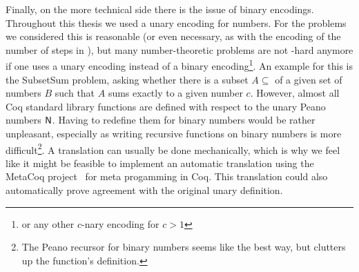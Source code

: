 Finally, on the more technical side there is the issue of binary encodings. Throughout this thesis we used a unary encoding for numbers. For the problems we considered this is reasonable (or even necessary, as with the encoding of the number of steps in \gennp{}), but many number-theoretic problems are not \NP{}-hard anymore if one uses a unary encoding instead of a binary encoding\footnote{or any other $c$-nary encoding for $c> 1$}. An example for this is the \textsf{SubsetSum} problem, asking whether there is a subset $A \subseteq$ of a given set of numbers $B$ such that $A$ sums exactly to a given number $c$. 
However, almost all Coq standard library functions are defined with respect to the unary Peano numbers $\mathsf{N}$. 
Having to redefine them for binary numbers would be rather unpleasant, especially as writing recursive functions on binary numbers is more difficult\footnote{The Peano recursor for binary numbers seems like the best way, but clutters up the function's definition.}. 
A translation can usually be done mechanically, which is why we feel like it might be feasible to implement an automatic translation using the MetaCoq project~\cite{metacoq_web} for meta progamming in Coq. This translation could also automatically prove agreement with the original unary definition. 

